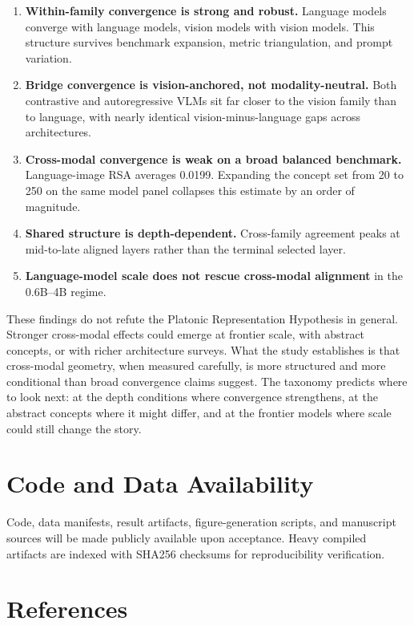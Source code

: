 \documentclass[10pt]{article}
\providecommand{\tightlist}{%
  \setlength{\itemsep}{0pt}\setlength{\parskip}{0pt}}
\begin{document}
\begin{enumerate}
\def\labelenumi{\arabic{enumi}.}
\tightlist
\item
  \textbf{Within-family convergence is strong and robust.} Language
  models converge with language models, vision models with vision
  models. This structure survives benchmark expansion, metric
  triangulation, and prompt variation.
\item
  \textbf{Bridge convergence is vision-anchored, not modality-neutral.}
  Both contrastive and autoregressive VLMs sit far closer to the vision
  family than to language, with nearly identical vision-minus-language
  gaps across architectures.
\item
  \textbf{Cross-modal convergence is weak on a broad balanced
  benchmark.} Language-image RSA averages 0.0199. Expanding the concept
  set from 20 to 250 on the same model panel collapses this estimate by
  an order of magnitude.
\item
  \textbf{Shared structure is depth-dependent.} Cross-family agreement
  peaks at mid-to-late aligned layers rather than the terminal selected
  layer.
\item
  \textbf{Language-model scale does not rescue cross-modal alignment} in
  the 0.6B--4B regime.
\end{enumerate}

These findings do not refute the Platonic Representation Hypothesis in
general. Stronger cross-modal effects could emerge at frontier scale,
with abstract concepts, or with richer architecture surveys. What the
study establishes is that cross-modal geometry, when measured carefully,
is more structured and more conditional than broad convergence claims
suggest. The taxonomy predicts where to look next: at the depth
conditions where convergence strengthens, at the abstract concepts where
it might differ, and at the frontier models where scale could still
change the story.

\section{Code and Data Availability}\label{code-and-data-availability}

Code, data manifests, result artifacts, figure-generation scripts, and
manuscript sources will be made publicly available upon acceptance.
Heavy compiled artifacts are indexed with SHA256 checksums for
reproducibility verification.

\section{References}\label{references}
\end{document}
